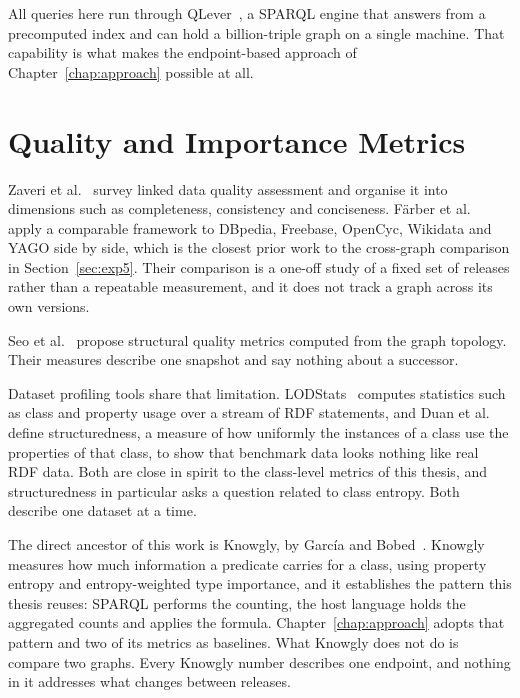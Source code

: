 All queries here run through QLever~\cite{bast2017qlever}, a SPARQL engine that
answers from a precomputed index and can hold a billion-triple graph on a single
machine. That capability is what makes the endpoint-based approach of
Chapter~\ref{chap:approach} possible at all.

\section{Quality and Importance Metrics}
\label{sec:rw_quality_metrics}

Zaveri et al.~\cite{zaveri2016quality} survey linked data quality assessment and
organise it into dimensions such as completeness, consistency and conciseness.
Färber et al.~\cite{farber2018linked} apply a comparable framework to DBpedia,
Freebase, OpenCyc, Wikidata and YAGO side by side, which is the closest prior
work to the cross-graph comparison in Section~\ref{sec:exp5}. Their comparison is
a one-off study of a fixed set of releases rather than a repeatable measurement,
and it does not track a graph across its own versions.

Seo et al.~\cite{seo2024structural} propose structural quality metrics computed
from the graph topology. Their measures describe one snapshot and say nothing
about a successor.

Dataset profiling tools share that limitation. LODStats~\cite{auer2012lodstats}
computes statistics such as class and property usage over a stream of RDF
statements, and Duan et al.~\cite{duan2011apples} define structuredness, a
measure of how uniformly the instances of a class use the properties of that
class, to show that benchmark data looks nothing like real RDF data. Both are
close in spirit to the class-level metrics of this thesis, and structuredness in
particular asks a question related to class entropy. Both describe one dataset
at a time.

The direct ancestor of this work is Knowgly, by García and
Bobed~\cite{garcia2025information}. Knowgly measures how much information a
predicate carries for a class, using property entropy and entropy-weighted type
importance, and it establishes the pattern this thesis reuses: SPARQL performs
the counting, the host language holds the aggregated counts and applies the
formula. Chapter~\ref{chap:approach} adopts that pattern and two of its metrics
as baselines. What Knowgly does not do is compare two graphs. Every Knowgly
number describes one endpoint, and nothing in it addresses what changes between
releases.

